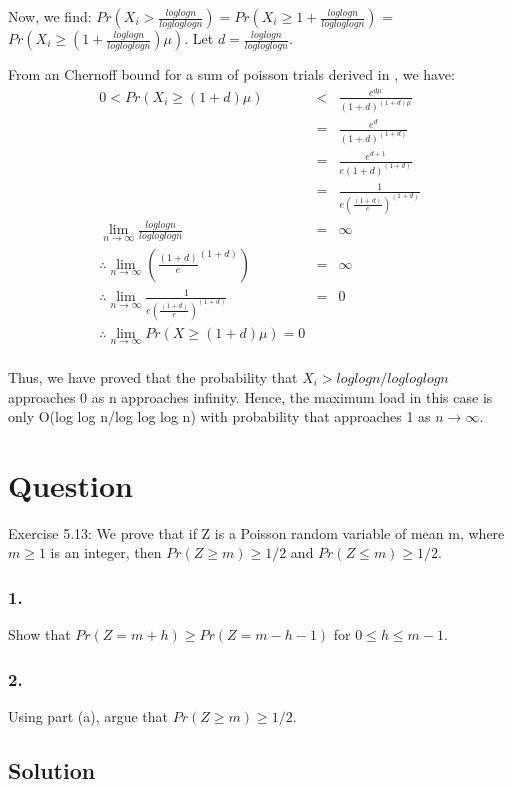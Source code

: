 \documentclass[10pt]{article}
\begin{document}
Now, we find: $Pr(X_{i}>\frac{log log n}{log log log n}) = Pr(X_{i}\geq 1+\frac{log log n}{log log log n})$ = $Pr(X_{i}\geq (1+\frac{log log n}{log log log n})\mu)$. Let $d=\frac{log log n}{log log log n}$.

From an Chernoff bound for a sum of poisson trials derived in \cite{mitzenmacherUpfal}, we have:
\begin{eqnarray}
0 < Pr(X_{i} \geq (1+d)\mu) &<& \frac{e^{d\mu}}{(1+d)^{(1+d)\mu}}\\
&=& \frac{e^{d}}{(1+d)^{(1+d)}}\\
&=& \frac{e^{d+1}}{e(1+d)^{(1+d)}}\\
&=& \frac{1}{e(\frac{(1+d)}{e})^{(1+d)}}\\
\lim_{n\rightarrow \infty}\frac{log log n}{log log log n} &=& \infty\\
\therefore \lim_{n\rightarrow \infty}(\frac{(1+d)}{e}^{(1+d)}) &=& \infty\\
\therefore \lim_{n\rightarrow \infty}\frac{1}{e(\frac{(1+d)}{e})^{(1+d)}} &=& 0\\
\therefore \lim_{n\rightarrow \infty} Pr(X \geq (1+d)\mu) = 0\\
\end{eqnarray}

Thus, we have proved that the probability that $X_{i} > log log n/log log log n$ approaches 0 as n approaches infinity. Hence, the maximum load in this case is only O(log log n/log log log n) with probability that approaches 1 as $n\rightarrow \infty$.

\section{Question}
Exercise 5.13: We prove that if Z is a Poisson random variable of mean m, where $m \geq 1$ is an integer, then $Pr(Z\geq m)\geq1/2$ and $Pr(Z\leq m)\geq1/2$.

\subsubsection{1.}
Show that $Pr(Z=m+h)\geq Pr(Z=m-h-1)$ for $0\leq h\leq m-1$.
\subsubsection{2.}
Using part (a), argue that $Pr(Z\geq m)\geq 1/2$.

\subsection{Solution}
\end{document}
